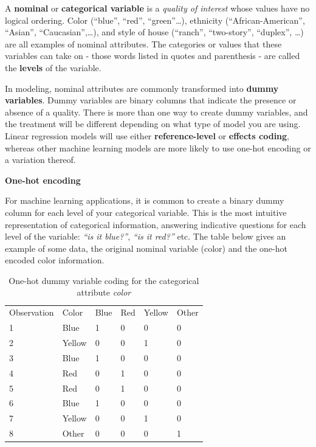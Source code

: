 \documentclass[
  letterpaper,
  DIV=11,
  numbers=noendperiod]{scrreprt}
\begin{document}
A \textbf{nominal} or \textbf{categorical variable} is a \emph{quality
of interest} whose values have no logical ordering. Color (``blue'',
``red'', ``green''\ldots), ethnicity (``African-American'', ``Asian'',
``Caucasian'',\ldots), and style of house (``ranch'', ``two-story'',
``duplex'', \ldots) are all examples of nominal attributes. The
categories or values that these variables can take on - those words
listed in quotes and parenthesis - are called the \textbf{levels} of the
variable.

In modeling, nominal attributes are commonly transformed into
\textbf{dummy variables}. Dummy variables are binary columns that
indicate the presence or absence of a quality. There is more than one
way to create dummy variables, and the treatment will be different
depending on what type of model you are using. Linear regression models
will use either \textbf{reference-level} or \textbf{effects coding},
whereas other machine learning models are more likely to use one-hot
encoding or a variation thereof.

\textbf{One-hot encoding}

For machine learning applications, it is common to create a binary dummy
column for each level of your categorical variable. This is the most
intuitive representation of categorical information, answering
indicative questions for each level of the variable: \emph{``is it
blue?''}, \emph{``is it red?''} etc. The table below gives an example of
some data, the original nominal variable (color) and the one-hot encoded
color information.

\hypertarget{tbl-onehot}{}
\begin{longtable}[]{@{}llllll@{}}
\caption{\label{tbl-onehot}One-hot dummy variable coding for the
categorical attribute \emph{color}}\tabularnewline
\toprule()
\endhead
Observation & Color & Blue & Red & Yellow & Other \\
1 & Blue & 1 & 0 & 0 & 0 \\
2 & Yellow & 0 & 0 & 1 & 0 \\
3 & Blue & 1 & 0 & 0 & 0 \\
4 & Red & 0 & 1 & 0 & 0 \\
5 & Red & 0 & 1 & 0 & 0 \\
6 & Blue & 1 & 0 & 0 & 0 \\
7 & Yellow & 0 & 0 & 1 & 0 \\
8 & Other & 0 & 0 & 0 & 1 \\
\bottomrule()
\end{longtable}
\end{document}
